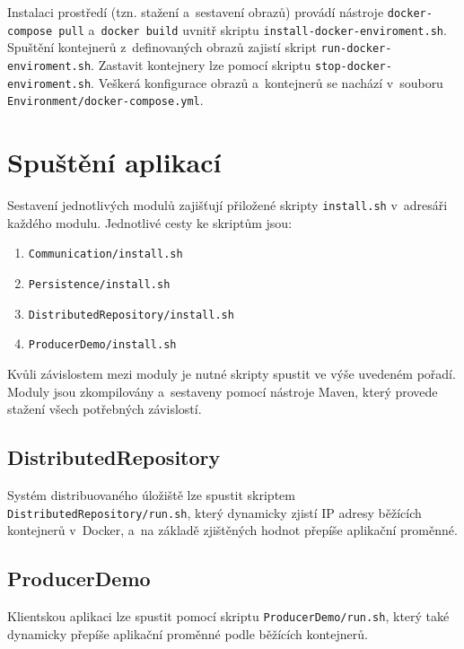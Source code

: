 Instalaci prostředí (tzn. stažení a~sestavení obrazů) provádí nástroje \texttt{docker-compose pull} a~\texttt{docker build} uvnitř skriptu \texttt{install-docker-enviroment.sh}. Spuštění kontejnerů z~definovaných obrazů zajistí skript \texttt{run-docker-enviroment.sh}. Zastavit kontejnery lze pomocí skriptu \texttt{stop-docker-enviroment.sh}. Veškerá konfigurace obrazů a~kontejnerů se nachází v~souboru \texttt{Environment/docker-compose.yml}.

\chapter{Spuštění aplikací} \label{launching}
Sestavení jednotlivých modulů zajišťují přiložené skripty \texttt{install.sh} v~adresáři každého modulu. Jednotlivé cesty ke skriptům jsou:

\begin{enumerate}
    \item \texttt{Communication/install.sh}
    
    \item \texttt{Persistence/install.sh}
    
    \item \texttt{DistributedRepository/install.sh}
    
    \item \texttt{ProducerDemo/install.sh}
\end{enumerate}

\noindent Kvůli závislostem mezi moduly je nutné skripty spustit ve výše uvedeném pořadí. Moduly jsou zkompilovány a~sestaveny pomocí nástroje Maven, který provede stažení všech potřebných závislostí.

\section{DistributedRepository}
Systém distribuovaného úložiště lze spustit skriptem \texttt{DistributedRepository/run.sh}, který dynamicky zjistí IP adresy běžících kontejnerů v~Docker, a~na základě zjištěných hodnot přepíše aplikační proměnné.

\section{ProducerDemo}
Klientskou aplikaci lze spustit pomocí skriptu \texttt{ProducerDemo/run.sh}, který také dynamicky přepíše aplikační proměnné podle běžících kontejnerů.

